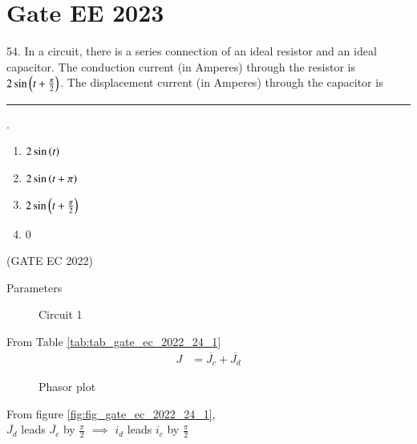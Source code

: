 \documentclass[journal,12pt,twocolumn]{IEEEtran}
\begin{document}


\vspace{3cm}

\title{}
\author{EE23BTECH11054 -  Sai Krishna Shanigarapu$^{*}$
}
\maketitle
\newpage
\bigskip


\section*{Gate EE 2023}
54. \hspace{2pt}In a circuit, there is a series connection of an ideal resistor and an ideal capacitor.
The conduction current (in Amperes) through the resistor is $2\sin\left(t + \frac{\pi}{2}\right)$. The displacement current (in Amperes) through the capacitor is \rule{1cm}{0.15mm}.\\ 
\begin{enumerate}[label=(\Alph*)]
    \item $2\sin\left(t\right)$
    \item $2\sin\left(t+\pi\right)$
    \item $2\sin\left(t +\frac{\pi}{2}\right)$
    \item $0$
\end{enumerate}
\hfill(GATE EC 2022)

\solution

\begin{table}[ht]
     \begin{adjustbox}{width=\columnwidth}
       
    \end{adjustbox}
    \caption{Parameters}
    \label{tab:tab_gate_ec_2022_24_1}
\end{table}

\begin{figure}[ht]
  \centering
      
  \caption{Circuit 1}
\end{figure}

From Table \ref{tab:tab_gate_ec_2022_24_1}
\begin{align}
    J &= \overline{J_c} + \overline{J_d}
\end{align}



\begin{figure}[ht]
  \centering
      
  \caption{Phasor plot}
\end{figure}
From figure \ref{fig:fig_gate_ec_2022_24_1},\\
$\overline{J_d}$ leads $\overline{J_c}$ by $\frac{\pi}{2}$ $\implies$  $i_d$ leads $i_c$ by $\frac{\pi}{2}$\\
\end{document}
